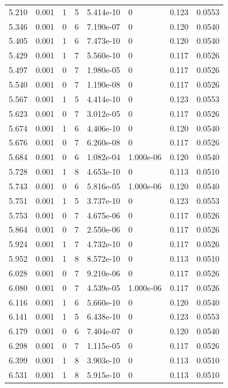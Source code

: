 \documentclass[preview]{standalone}
\begin{document}
{{{\begin{tabular}{L{1.2cm}C{1.2cm} C{0.3cm}C{0.5cm} C{1.4cm}C{1.4cm} C{1.4cm}C{1.4cm}}
  5.210  &  0.001  & 1     &  5 &  5.414e-10  & 0  & 0.123 &  0.0553   \\ 
  5.346  &  0.001  & 0     &  6 &  7.190e-07  & 0  & 0.120 &  0.0540   \\ 
  5.405  &  0.001  & 1     &  6 &  7.473e-10  & 0  & 0.120 &  0.0540   \\ 
  5.429  &  0.001  & 1     &  7 &  5.560e-10  & 0  & 0.117 &  0.0526   \\ 
  5.497  &  0.001  & 0     &  7 &  1.980e-05  & 0  & 0.117 &  0.0526   \\ 
  5.540  &  0.001  & 0     &  7 &  1.190e-08  & 0  & 0.117 &  0.0526   \\ 
  5.567  &  0.001  & 1     &  5 &  4.414e-10  & 0  & 0.123 &  0.0553   \\ 
  5.623  &  0.001  & 0     &  7 &  3.012e-05  & 0  & 0.117 &  0.0526   \\ 
  5.674  &  0.001  & 1     &  6 &  4.406e-10  & 0  & 0.120 &  0.0540   \\ 
  5.676  &  0.001  & 0     &  7 &  6.260e-08  & 0  & 0.117 &  0.0526   \\ 
  5.684  &  0.001  & 0     &  6 &  1.082e-04  & 1.000e-06  & 0.120 &  0.0540   \\ 
  5.728  &  0.001  & 1     &  8 &  4.653e-10  & 0  & 0.113 &  0.0510   \\ 
  5.743  &  0.001  & 0     &  6 &  5.816e-05  & 1.000e-06  & 0.120 &  0.0540   \\ 
  5.751  &  0.001  & 1     &  5 &  3.737e-10  & 0  & 0.123 &  0.0553   \\ 
  5.753  &  0.001  & 0     &  7 &  4.675e-06  & 0  & 0.117 &  0.0526   \\ 
  5.864  &  0.001  & 0     &  7 &  2.550e-06  & 0  & 0.117 &  0.0526   \\ 
  5.924  &  0.001  & 1     &  7 &  4.732e-10  & 0  & 0.117 &  0.0526   \\ 
  5.952  &  0.001  & 1     &  8 &  8.572e-10  & 0  & 0.113 &  0.0510   \\ 
  6.028  &  0.001  & 0     &  7 &  9.210e-06  & 0  & 0.117 &  0.0526   \\ 
  6.080  &  0.001  & 0     &  7 &  4.539e-05  & 1.000e-06  & 0.117 &  0.0526   \\ 
  6.116  &  0.001  & 1     &  6 &  5.660e-10  & 0  & 0.120 &  0.0540   \\ 
  6.141  &  0.001  & 1     &  5 &  6.438e-10  & 0  & 0.123 &  0.0553   \\ 
  6.179  &  0.001  & 0     &  6 &  7.404e-07  & 0  & 0.120 &  0.0540   \\ 
  6.298  &  0.001  & 0     &  7 &  1.115e-05  & 0  & 0.117 &  0.0526   \\ 
  6.399  &  0.001  & 1     &  8 &  3.903e-10  & 0  & 0.113 &  0.0510   \\ 
  6.531  &  0.001  & 1     &  8 &  5.915e-10  & 0  & 0.113 &  0.0510   \\ 
\hline 
\end{tabular} 

}}}
\end{document}
